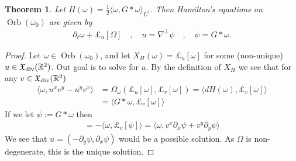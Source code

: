 \documentclass[12pt]{amsart}
\newcommand{\R}{\ensuremath{\mathbb{R}}}
\newtheorem{thm}{Theorem}[section]
\DeclareMathOperator{\Orb}{Orb}
\begin{document}
\begin{thm}
	Let $H(\omega) = \frac{1}{2} \langle \omega , G*\omega \rangle_{L^2}$.  Then Hamilton's equations on $\Orb(\omega_0)$
	are given by
	\begin{align*}
		\partial_t \omega + \pounds_u[\Omega] \quad,\quad u = \nabla^\perp \psi \quad,\quad \psi = G*\omega.
	\end{align*}
\end{thm}
\begin{proof}
  Let $\omega \in \Orb(\omega_0)$, and let $X_H(\omega) = \pounds_u[\omega]$ for some (non-unique) $u \in \mathfrak{X}_{\rm div}(\R^2)$.
  Out goal is to solve for $u$.
  By the definition of $X_H$ we see that for any
  $v \in \mathfrak{X}_{\rm div}(\R^2)$
  \begin{align*}
    \langle \omega , u^x v^y - u^y v^x \rangle &=
    \Omega_{\omega}( \pounds_u[\omega] , \pounds_v[\omega] ) = \langle dH(\omega) , \pounds_v[\omega] \rangle \\
    &= \langle G * \omega , \pounds_v[\omega] \rangle 
  \end{align*}
  If we let $\psi := G*\omega$ then
  \begin{align*}
    = - \langle \omega , \pounds_{v}[\psi] \rangle 
    = \langle \omega , v^x \partial_x \psi + v^y \partial_y \psi \rangle
  \end{align*}
  We see that $u = (-\partial_y \psi,\partial_x \psi)$
  would be a possible solution.
  As $\Omega$ is non-degenerate, this is the unique solution.
\end{proof}
\end{document}
